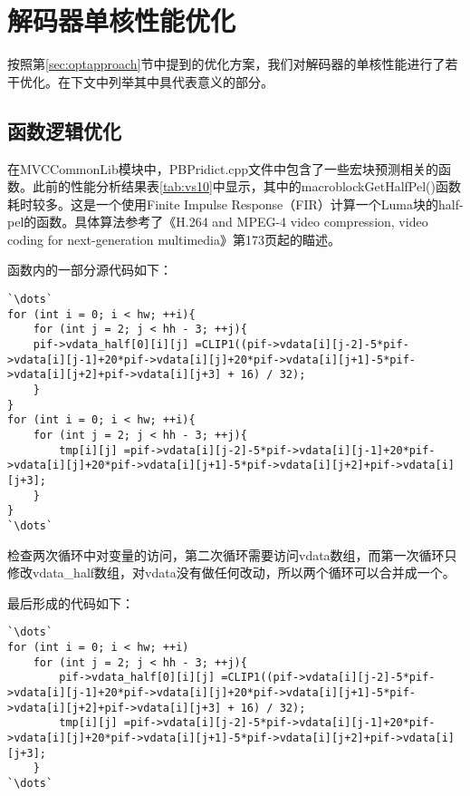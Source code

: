 

\chapter{解码器单核性能优化}
\label{cha:singlecoreopt}

按照第\ref{sec:optapproach}节中提到的优化方案，我们对解码器的单核性能进行了若干优化。在下文中列举其中具代表意义的部分。

\section{函数逻辑优化}
\label{sec:singlecorelogicopt}

在MVCCommonLib模块中，PBPridict.cpp文件中包含了一些宏块预测相关的函数。此前的性能分析结果表\ref{tab:vs10}中显示，其中的macroblockGetHalfPel()函数耗时较多。这是一个使用Finite Impulse Response（FIR）计算一个Luma块的half-pel的函数。具体算法参考了《H.264 and MPEG-4 video compression, video coding for next-generation multimedia》\cite{richardson2003h}第173页起的瞄述。

函数内的一部分源代码如下：
\begin{lstlisting}[caption = {macroblockGetHalfPel()函数片段（优化前）}, label = lst:macroblockGetHalfPelorig]
`\dots`
for (int i = 0; i < hw; ++i){
	for (int j = 2; j < hh - 3; ++j){
	pif->vdata_half[0][i][j] =CLIP1((pif->vdata[i][j-2]-5*pif->vdata[i][j-1]+20*pif->vdata[i][j]+20*pif->vdata[i][j+1]-5*pif->vdata[i][j+2]+pif->vdata[i][j+3] + 16) / 32);
	}
}
for (int i = 0; i < hw; ++i){
	for (int j = 2; j < hh - 3; ++j){
		tmp[i][j] =pif->vdata[i][j-2]-5*pif->vdata[i][j-1]+20*pif->vdata[i][j]+20*pif->vdata[i][j+1]-5*pif->vdata[i][j+2]+pif->vdata[i][j+3];
	}
}
`\dots`
\end{lstlisting}

检查两次循环中对变量的访问，第二次循环需要访问vdata数组，而第一次循环只修改vdata\_half数组，对vdata没有做任何改动，所以两个循环可以合并成一个。

最后形成的代码如下：

\begin{lstlisting}[caption = {macroblockGetHalfPel()函数片段（优化后）}, label = lst:macroblockGetHalfPelopt]
`\dots`
for (int i = 0; i < hw; ++i)
	for (int j = 2; j < hh - 3; ++j){
		pif->vdata_half[0][i][j] =CLIP1((pif->vdata[i][j-2]-5*pif->vdata[i][j-1]+20*pif->vdata[i][j]+20*pif->vdata[i][j+1]-5*pif->vdata[i][j+2]+pif->vdata[i][j+3] + 16) / 32);
		tmp[i][j] =pif->vdata[i][j-2]-5*pif->vdata[i][j-1]+20*pif->vdata[i][j]+20*pif->vdata[i][j+1]-5*pif->vdata[i][j+2]+pif->vdata[i][j+3];
	}
`\dots`
\end{lstlisting}

